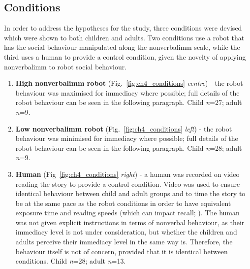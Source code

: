 \subsection{Conditions} \label{sec:ch4-conditions}
In order to address the hypotheses for the study, three conditions were devised which were shown to both children and adults. Two conditions use a robot that has the social behaviour manipulated along the \gls{nonverbalimm} scale, while the third uses a human to provide a control condition, given the novelty of applying \gls{nonverbalimm} to robot social behaviour.
\begin{enumerate}
	\item \textbf{High \gls{nonverbalimm} robot} (Fig.~\ref{fig:ch4_conditions} \textit{centre}) - the robot behaviour was maximised for immediacy where possible; full details of the robot behaviour can be seen in the following paragraph. Child \textit{n}=27; adult \textit{n}=9.
	\item \textbf{Low \gls{nonverbalimm} robot} (Fig.~\ref{fig:ch4_conditions} \textit{left}) - the robot behaviour was minimised for immediacy where possible; full details of the robot behaviour can be seen in the following paragraph. Child \textit{n}=28; adult \textit{n}=9.
	\item \textbf{Human} (Fig~\ref{fig:ch4_conditions} \textit{right}) - a human was recorded on video reading the story to provide a control condition. Video was used to ensure identical behaviour between child and adult groups and to time the story to be at the same pace as the robot conditions in order to have equivalent exposure time and reading speeds (which can impact recall; \citealp{hulme1989working, simonds2006effects}). The human was not given explicit instructions in terms of nonverbal behaviour, as their \gls{immediacy} level is not under consideration, but whether the children and adults perceive their immediacy level in the same way is. Therefore, the behaviour itself is not of concern, provided that it is identical between conditions. Child \textit{n}=28; adult \textit{n}=13.
\end{enumerate}


